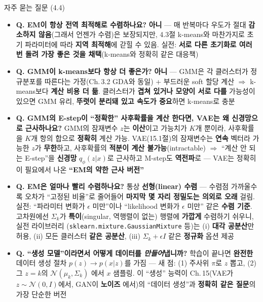 \documentclass[aspectratio=169,11pt]{beamer}
\begin{document}
\begin{frame}{자주 묻는 질문 (4.4)}
  \small
  \begin{itemize}
    \item \textbf{Q. EM이 항상 전역 최적해로 수렴하나요?}
      \textbf{아니} --- 매 반복마다 우도가 절대 \textbf{감소하지
      않음}(그래서 언젠가 수렴)은 보장되지만, 4.3절 k-means와
      마찬가지로 초기 파라미터에 따라 \textbf{지역 최적해}에
      갇힐 수 있음. 실전: \textbf{서로 다른 초기화로 여러 번
      돌려 가장 좋은 것을 채택}(k-means와 정확히 같은 대응책)
    \item \textbf{Q. GMM이 k-means보다 항상 더 좋은가?}
      \textbf{아니} --- GMM은 각 클러스터가 정규분포를 따른다는
      가정(Ch.\,3.2 GDA와 동일) + 부드러운 soft 할당 계산
      $\Rightarrow$ k-means보다 \textbf{계산 비용 더 듦}.
      클러스터가 \textbf{겹쳐 있거나 모양이 서로 다를} 가능성이
      있으면 GMM 유리, \textbf{뚜렷이 분리돼 있고 속도가
      중요}하면 k-means로 충분
    \item \textbf{Q. GMM의 E-step이 ``정확한'' 사후확률을 계산
      한다면, VAE는 왜 신경망으로 근사하나요?}
      GMM의 잠재변수 $z$는 \textbf{이산}이고 가능치가 $K$개
      뿐이라, 사후확률을 $K$개 항의 합으로 \textbf{정확히}
      계산 가능. VAE(15.1절)의 잠재변수는 \textbf{연속}
      벡터라 가능한 $z$가 \textbf{무한}하고, 사후확률의
      \textbf{적분이 계산 불가능}(intractable)
      $\Rightarrow$ ``계산 안 되는 E-step''을 \textbf{신경망}
      $q_\phi(z|x)$로 근사하고 M-step도 \textbf{역전파}로
      --- VAE는 정확히 이 필요에서 나온 \textbf{``EM의 약한
      근사 버전''}
    \item \textbf{Q. EM은 얼마나 빨리 수렴하나요?}
      통상 \textbf{선형(linear) 수렴} --- 수렴점 가까울수록
      오차가 ``고정된 비율''로 줄어들어 \textbf{마지막 몇 자리
      정밀도는 의외로 오래} 걸림. 실전: ``파라미터 변화가
      $\epsilon$ 미만''이나 ``likelihood 변화가 $\epsilon$
      미만'' 같은 \textbf{수렴 기준}. 고차원에선 $\Sigma_k$가
      \textbf{특이}(singular, 역행렬이 없는) 행렬에 \textbf{가깝게}
      수렴하기 쉬우니, 실전 라이브러리
      (\texttt{sklearn.mixture.GaussianMixture} 등)는
      (i) \textbf{대각 공분산}만 허용, (ii) 모든 클러스터
      \textbf{같은 공분산}, (iii) $\Sigma_k + \epsilon I$ 같은
      \textbf{정규화} 옵션 제공
    \item \textbf{Q. ``생성 모델''이라면서 어떻게 데이터를
      \emph{만들어}냅니까?}
      학습이 끝나면 \textbf{완전한} 데이터 생성 절차
      $p(z) \to p(x|z)$를 가짐 --- 새 점: (1) 주사위 $\pi$로
      $z$ 뽑고, (2) 그 $z = k$의 $\mathcal{N}(\mu_k, \Sigma_k)$
      에서 $x$ 샘플링. 이 ``생성'' 능력이 Ch.\,15(VAE가
      $z \sim \mathcal{N}(0, I)$에서, GAN이 \textbf{노이즈}
     에서)의 ``데이터 생성''과 \textbf{정확히 같은 질문}의
      가장 단순한 버전
  \end{itemize}
\end{frame}
\end{document}
